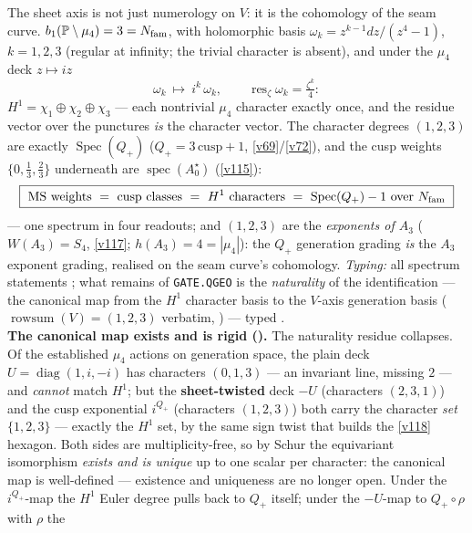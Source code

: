 \begin{keybox}
The sheet axis is not just numerology on $V$: it is the cohomology of the seam curve.
$b_1(\mathbb{P}\setminus\mu_4)=3=N_{\mathrm{fam}}$, with holomorphic basis $\omega_k=z^{k-1}dz/(z^4-1)$, $k=1,2,3$
(regular at infinity; the trivial character is absent), and under the $\mu_4$ deck $z\mapsto iz$
\[
  \omega_k\ \longmapsto\ i^k\,\omega_k,\qquad
  \operatorname{res}_{\zeta}\omega_k=\tfrac{\zeta^k}4 :
\]
$H^1=\chi_1\oplus\chi_2\oplus\chi_3$ --- each nontrivial $\mu_4$ character exactly once, and the residue
vector over the punctures \emph{is} the character vector. The character degrees $(1,2,3)$ are exactly
$\operatorname{Spec}(Q_+)$ ($Q_+=3\,\mathrm{cusp}+1$, \vref{v69}/\vref{v72}), and the cusp weights $\{0,\tfrac13,
\tfrac23\}$ underneath are $\operatorname{spec}(A_0^\star)$ (\vref{v115}):
\[
  \boxed{\ \text{MS weights}\ =\ \text{cusp classes}\ =\ H^1\text{ characters}\ =\
  \operatorname{Spec}(Q_+)-1\ \text{over } \Nfam\ }
\]
--- one spectrum in four readouts; and $(1,2,3)$ are the \emph{exponents of $A_3$} ($W(A_3)=S_4$, \vref{v117};
$h(A_3)=4=|\mu_4|$): the $Q_+$ generation grading \emph{is} the $A_3$ exponent grading, realised on the
seam curve's cohomology. \emph{Typing:} all spectrum statements \mE; what remains of \texttt{GATE.QGEO}
is the \emph{naturality} of the identification --- the canonical map from the $H^1$ character basis to
the $V$-axis generation basis ($\operatorname{rowsum}(V)=(1,2,3)$ verbatim, )
--- typed \mC.
\smallskip\\
\noindent\textbf{The canonical map exists and is rigid ().} The naturality
residue collapses. Of the established $\mu_4$ actions on generation space, the plain deck
$U=\operatorname{diag}(1,i,-i)$ has characters $(0,1,3)$ --- an invariant line, missing $2$ --- and
\emph{cannot} match $H^1$; but the \textbf{sheet-twisted} deck $-U$ (characters $(2,3,1)$) and the cusp
exponential $i^{Q_+}$ (characters $(1,2,3)$) both carry the character \emph{set} $\{1,2,3\}$ --- exactly
the $H^1$ set, by the same sign twist that builds the \vref{v118} hexagon. Both sides are multiplicity-free, so
by Schur the equivariant isomorphism \emph{exists and is unique} up to one scalar per character: the
canonical map is well-defined --- existence and uniqueness are no longer open. Under the $i^{Q_+}$-map
the $H^1$ Euler degree pulls back to $Q_+$ itself; under the $-U$-map to $Q_+\!\circ\rho$ with $\rho$ the

\end{keybox}
